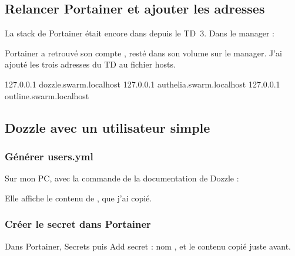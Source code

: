 \subsection{Relancer Portainer et ajouter les adresses}

La stack de Portainer était encore dans  depuis le TD~3. Dans le manager :

\begin{commandes}
\end{commandes}

Portainer a retrouvé son compte , resté dans son volume sur le manager. J'ai ajouté les trois adresses du TD au fichier hosts.

\begin{fichier}[text]
127.0.0.1   dozzle.swarm.localhost
127.0.0.1   authelia.swarm.localhost
127.0.0.1   outline.swarm.localhost
\end{fichier}


\subsection{Dozzle avec un utilisateur simple}

\subsubsection{Générer users.yml}

Sur mon PC, avec la commande de la documentation de Dozzle :

\begin{commandes}
\end{commandes}

Elle affiche le contenu de , que j'ai copié.

\subsubsection{Créer le secret dans Portainer}

Dans Portainer, \og Secrets\fg{} puis \og Add secret\fg{} : nom , et le contenu copié juste avant.



